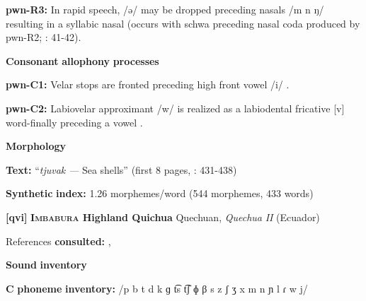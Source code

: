 \documentclass[output=paper]{langsci/langscibook}
\begin{document}
\begin{styleBody}
\textbf{pwn-R3:} In rapid speech, /ə/ may be dropped preceding nasals /m n ŋ/ resulting in a syllabic nasal (occurs with schwa preceding nasal coda produced by pwn-R2; \citealt{Chang2006}: 41-42).
\end{styleBody}

\begin{styleBody}
\textbf{Consonant} \textbf{allophony} \textbf{processes}
\end{styleBody}

\begin{styleBody}
\textbf{pwn-C1:} Velar stops are fronted preceding high front vowel /i/ \citep[22]{Chang2006}.
\end{styleBody}

\begin{styleBody}
\textbf{pwn-C2:} Labiovelar approximant /w/ is realized as a labiodental fricative [v] word-finally preceding a vowel \citep[40]{Chang2006}.
\end{styleBody}

\begin{styleBody}
\textbf{Morphology}
\end{styleBody}

\begin{styleBody}
\textbf{Text:} “\textit{tjuvak} \textit{—} Sea shells” (first 8 pages, \citealt{Chang2006}: 431-438)
\end{styleBody}

\begin{styleBody}
\textbf{Synthetic} \textbf{index:} 1.26 morphemes/word (544 morphemes, 433 words)
\end{styleBody}

\begin{styleBody}
\textbf{[qvi]}   \textbf{\textsc{Imbabura} \textbf{Highland} \textbf{Quichua}}    Quechuan, \textit{Quechua} \textit{II} (Ecuador)
\end{styleBody}

\begin{styleBody}
References \textbf{consulted:} \citet{Carpenter1982}, \citet{Cole1982}
\end{styleBody}

\begin{styleBody}
\textbf{Sound} \textbf{inventory}
\end{styleBody}

\begin{styleBody}
\textbf{C} \textbf{phoneme} \textbf{inventory:} /p b t d k ɡ t͡s t͡ʃ ɸ β s z ʃ ʒ x m n ɲ l ɾ w j/
\end{styleBody}
\end{document}
